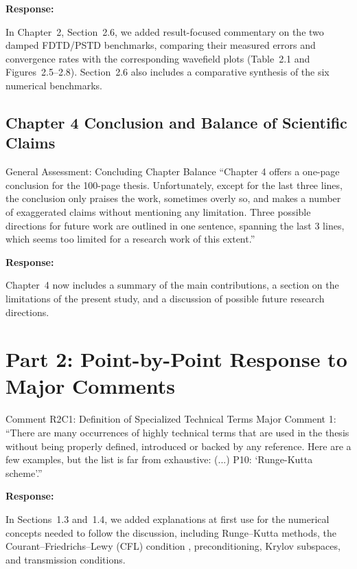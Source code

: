 \documentclass[11pt,a4paper]{article}
\newenvironment{response}{
    \par\vspace{1mm}\noindent\textbf{\textcolor{responseframe}{Response:}}\par\vspace{1mm}
}{
    \par\vspace{3mm}
}
\begin{document}
\begin{response}
In Chapter~2, Section~2.6, we added result-focused commentary on the two damped FDTD/PSTD benchmarks, comparing their measured errors and convergence rates with the corresponding wavefield plots (Table~2.1 and Figures~2.5--2.8). Section~2.6 also includes a comparative synthesis of the six numerical benchmarks.
\end{response}

\subsection{Chapter 4 Conclusion and Balance of Scientific Claims}
\begin{revcomment}{General Assessment: Concluding Chapter Balance}
``Chapter 4 offers a one-page conclusion for the 100-page thesis. Unfortunately, except for the last three lines, the conclusion only praises the work, sometimes overly so, and makes a number of exaggerated claims without mentioning any limitation. Three possible directions for future work are outlined in one sentence, spanning the last 3 lines, which seems too limited for a research work of this extent.''
\end{revcomment}

\begin{response}
Chapter~4 now includes a summary of the main contributions, a section on the limitations of the present study, and a discussion of possible future research directions.
\end{response}

\newpage
\section{Part 2: Point-by-Point Response to Major Comments}

\begin{revcomment}{Comment R2C1: Definition of Specialized Technical Terms}
Major Comment 1: ``There are many occurrences of highly technical terms that are used in the thesis without being properly defined, introduced or backed by any reference. Here are a few examples, but the list is far from exhaustive: (...) P10: `Runge-Kutta scheme'.''
\end{revcomment}

\begin{response}
In Sections~1.3 and~1.4, we added explanations at first use for the numerical concepts needed to follow the discussion, including Runge--Kutta methods, the Courant--Friedrichs--Lewy (CFL) condition \citep{courant1928partiellen}, preconditioning, Krylov subspaces, and transmission conditions.
\end{response}
\end{document}
